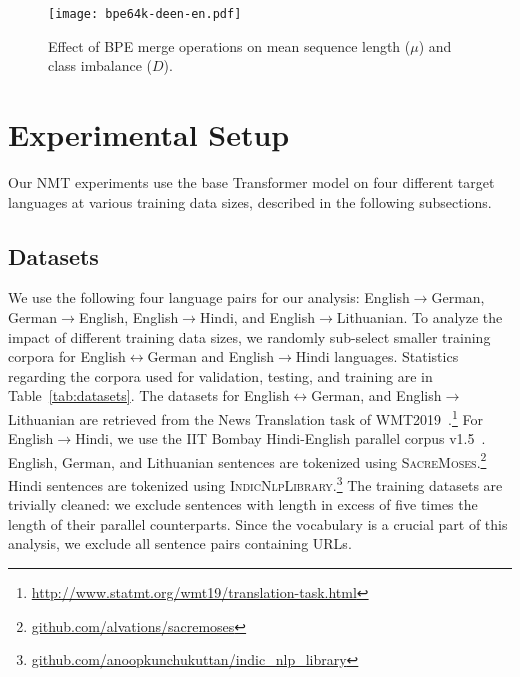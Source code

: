  \begin{figure}[ht]
  \centering
    \texttt{[image: bpe64k-deen-en.pdf]}
    \caption{Effect of BPE merge operations on mean sequence length ($\mu$) and class imbalance ($D$).
    }
    \label{fig:BPE-imbalance}
\end{figure}


\section{Experimental Setup}
\label{sec:exp-setup}

Our NMT experiments use the base Transformer model \cite{vaswani2017attention} on four different target languages at various training data sizes, described in the following subsections.

\subsection{Datasets}
We use the following four language pairs for our analysis: English$\rightarrow$German, German$\rightarrow$English, English$\rightarrow$Hindi, and English$\rightarrow$Lithuanian.
To analyze the impact of different training data sizes, we randomly sub-select smaller training corpora for English$\leftrightarrow$German and English$\rightarrow$Hindi languages.
Statistics regarding the corpora used for validation, testing, and training are in Table~\ref{tab:datasets}.
The datasets for English$\leftrightarrow$German, and English$\rightarrow$Lithuanian are retrieved from the News Translation task of WMT2019~\cite{wmt19proceedings}.\footnote{\url{http://www.statmt.org/wmt19/translation-task.html}}
For English$\rightarrow$Hindi, we use the IIT Bombay Hindi-English parallel corpus v1.5~\cite{iitb-hien}.
English, German, and Lithuanian sentences are tokenized using \textsc{SacreMoses}.\footnote{\url{github.com/alvations/sacremoses}}
Hindi sentences are tokenized using \textsc{IndicNlpLibrary}.\footnote{\url{github.com/anoopkunchukuttan/indic_nlp_library}}
The training datasets are trivially cleaned: we exclude sentences with length in excess of five times the length of their parallel counterparts.
Since the vocabulary is a crucial part of this analysis, we exclude all sentence pairs containing URLs.

